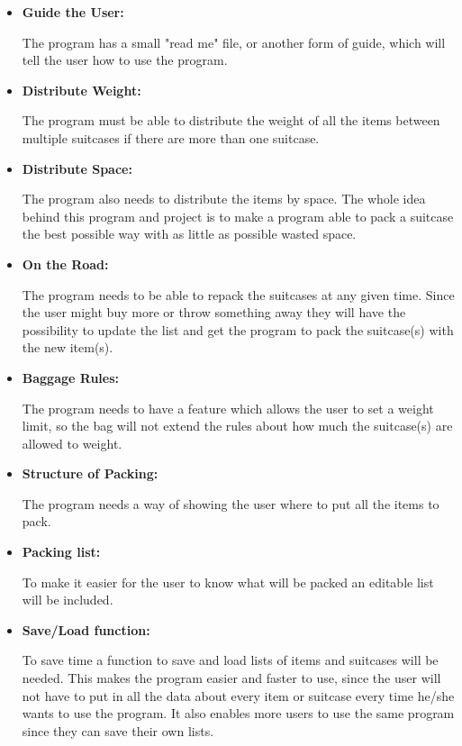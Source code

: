 \begin{itemize}
\item \textbf{Guide the User:}

The program has a small "read me" file, or another form of guide, which will tell the user how to use the program.

\item \textbf{Distribute Weight:}

The program must be able to distribute the weight of all the items between multiple suitcases if there are more than one suitcase.

\item \textbf{Distribute Space:}

The program also needs to distribute the items by space. The whole idea behind this program and project is to make a program able to pack a suitcase the best possible way with as little as possible wasted space.

\item \textbf{On the Road:}

The program needs to be able to repack the suitcases at any given time. Since the user might buy more or throw something away they will have the possibility to update the list and get the program to pack the suitcase(s) with the new item(s).

\item \textbf{Baggage Rules:}

The program needs to have a feature which allows the user to set a weight limit, so the bag will not extend the rules about how much the suitcase(s) are allowed to weight.

\item \textbf{Structure of Packing:}

The program needs a way of showing the user where to put all the items to pack.

\item \textbf{Packing list:}

To make it easier for the user to know what will be packed an editable list will be included.

\item \textbf{Save/Load function:}

To save time a function to save and load lists of items and suitcases will be needed. This makes the program easier and faster to use, since the user will not have to put in all the data about every item or suitcase every time he/she wants to use the program. It also enables more users to use the same program since they can save their own lists.
\end{itemize}

